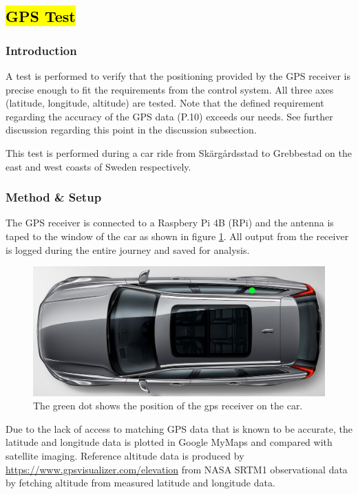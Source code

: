 \subsection{\hl{GPS Test}}
\label{app:gps_test}
\subsubsection*{Introduction}
\vspace{-.3cm}
A test is performed to verify that the positioning provided by the GPS receiver is precise enough to fit the requirements from the control system. All three axes (latitude, longitude, altitude) are tested. Note that the defined requirement regarding the accuracy of the GPS data (P.10) exceeds our needs. See further discussion regarding this point in the discussion subsection. 

This test is performed during a car ride from Skärgårdsstad to Grebbestad on the east and west coasts of Sweden respectively.

\subsubsection*{Method \& Setup}
\vspace{-.3cm}
The GPS receiver is connected to a Raspbery Pi 4B (RPi) and the antenna is taped to the window of the car as shown in figure \ref{gps_pos}. All output from the receiver is logged during the entire journey and saved for analysis.

\begin{figure}[H]
	\includegraphics[width=\textwidth]{appendix/img/test-results/gps_pos.png}
	\caption{The green dot shows the position of the gps receiver on the car.}
	\label{gps_pos}
\end{figure}

Due to the lack of access to matching GPS data that is known to be accurate, the latitude and longitude data is plotted in Google MyMaps and compared with satellite imaging. Reference altitude data is produced by \url{https://www.gpsvisualizer.com/elevation} from NASA SRTM1 observational data by fetching altitude from measured latitude and longitude data.

